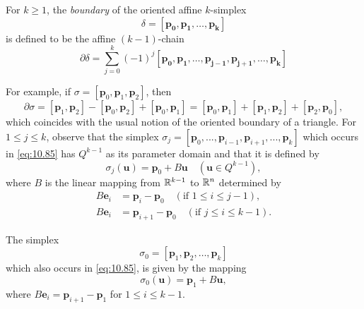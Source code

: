 \begin{mydef}
    \label{mydef:10.29}
    For $k \geq 1$, the \emph{boundary} of the oriented affine $k$-simplex
    \begin{equation*}
        \delta = \left[ \mathbf{p_0,p_1,\dots,p_k} \right]
    \end{equation*}
    is defined to be the affine $(k - 1)$-chain
    \begin{equation}
        \label{eq:10.85}
        \partial \delta = \sum_{j=0}^{k} (-1)^j
        \left[ \mathbf{p_0,p_1,\dots,p_{j-1},p_{j+1},\dots,p_k} \right]
    \end{equation}
\end{mydef}

For example, if $\sigma = [\mathbf{p}_0 , \mathbf{p}_1, \mathbf{p}_2 ]$, then
\begin{equation*}
    \partial\sigma = 
    [\mathbf{p}_1, \mathbf{p}_2] - 
    [\mathbf{p}_0, \mathbf{p}_2] + 
    [\mathbf{p}_0, \mathbf{p}_1] = 
    [\mathbf{p}_0, \mathbf{p}_1] + 
    [\mathbf{p}_1, \mathbf{p}_2] + 
    [\mathbf{p}_2, \mathbf{p}_0] ,
\end{equation*}
which coincides with the usual notion of the oriented boundary of a triangle.
For $1 \leq j \leq k$, observe that the simplex $\sigma_j = [\mathbf{p}_0 , ... , \mathbf{p}_{i- 1} , \mathbf{p}_{i+ 1}, ... , \mathbf{p}_k]$
which occurs in \eqref{eq:10.85} has $Q^{k- 1}$ as its parameter domain and that it is defined by
\begin{equation}
    \label{eq:10.86}
    \sigma_j(\mathbf{u}) = \mathbf{p}_0 + B\mathbf{u} 
    \quad 
    (\mathbf{u} \in Q^{k-1}),
\end{equation}
where $B$ is the linear mapping from ${\protect\mathbb R}^{k-1}$ to ${\protect\mathbb R}^n$ determined by 
\begin{align*}
    B\mathbf{e}_i &= \mathbf{p}_i - \mathbf{p}_0 \quad (\text{if } 1 \leq i \leq j-1) , \\
    B\mathbf{e}_i &= \mathbf{p}_{i+1} - \mathbf{p}_0 \quad (\text{if } j \leq i \leq k-1) .
\end{align*}

The simplex 
\begin{equation*}
    \sigma_0 = [\mathbf{p}_1,\mathbf{p}_2,\dots,\mathbf{p}_k]
\end{equation*}
which also occurs in \eqref{eq:10.85}, is given by the mapping
\begin{equation*}
    \sigma_0(\mathbf{u}) = \mathbf{p}_1 + B \mathbf{u},
\end{equation*}
where $B\mathbf{e}_i = \mathbf{p}_{i+1} - \mathbf{p}_1$ for $1 \leq i \leq k-1$.



